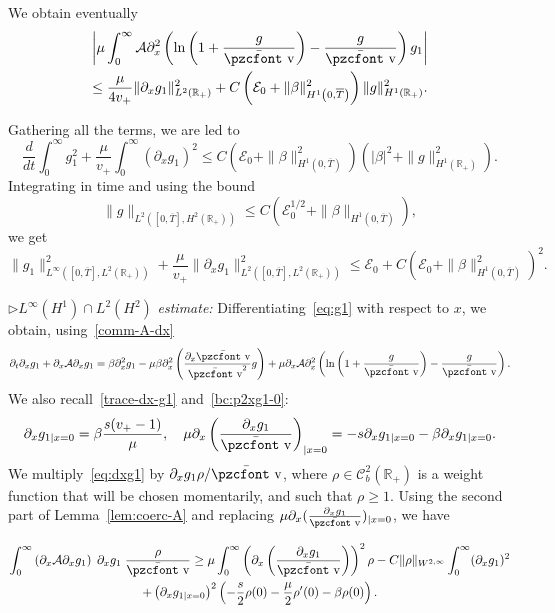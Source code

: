 \documentclass[10pt]{amsart}
\theoremstyle{definition}\newtheorem{defi}[theo]{Definition}\newtheorem{rema}[theo]{Remark}\newtheorem{exam}[theo]{Example}\newtheorem{exem}[theo]{Example}\newtheorem{nota}[theo]{Notation}
\newcommand{\mathpzc}[1]{\text{\pzcfont #1}}
\newcommand{\R}{\mathbb{R}}
\newcommand{\p}{\partial}
\newcommand{\bv}{\bar{\mathpzc{v}}}
\newcommand{\cA}{\mathcal A}
\newcommand{\cE}{\mathcal E}
\newcommand{\cC}{\mathcal C}
\begin{document}
\begin{itemize}
We obtain eventually
\begin{multline*}
\left| \mu \int_0^\infty\cA \p_x^2 \left(\ln\left(1+ \frac{g}{\bv}\right) - \frac{g}{\bv}\right) g_1\right|\\
\leq \frac{\mu}{4 v_+}\|\p_x g_1\|_{L^2(\R_+)}^2 + C \left(\cE_0 + \|\beta\|_{H^1\left(0, \overline{T}\right)}^2\right) \| g\|_{H^1(\R_+)}^2.
\end{multline*}
\end{itemize}
Gathering all the terms, we are led to
\[
\frac{d}{dt}\int_0^\infty g_1^2 + \frac{\mu}{v_+}\int_0^\infty (\p_x g_1)^2
\leq C\left(\cE_0 + \|\beta\|_{H^1\left(0, \overline{T}\right)}^2\right)\left(|\beta|^2 + \| g \|_{H^1(\R_+)}^2\right).
\]
Integrating in time and using the bound
\[
\|g\|_{L^2\left([0, \overline{T}], H^2(\R_+)\right)}\leq C\left(\cE_0^{1/2} + \|\beta\|_{H^1\left(0, \overline{T}\right)}\right),
\]
we get
\begin{equation}\label{borne-g1-L2H1}
\|g_1\|_{L^\infty\left([0,\overline{T}], L^2(\R_+)\right)}^2 + \frac{\mu}{v_+}\|\p_x g_1\|_{L^2\left([0,\overline{T}], L^2(\R_+)\right)}^2 \leq \cE_0 + C \left(\cE_0 + \|\beta\|_{H^1\left(0, \overline{T}\right)}^2\right)^2.
\end{equation}


$\rhd L^\infty(H^1)\cap L^2(H^2)$ \emph{estimate:} Differentiating~\eqref{eq:g1} with respect to $x$, we obtain, using~\eqref{comm-A-dx}
\begin{equation}\label{eq:dxg1}
\p_t \p_x g_1 + \p_x \cA \p_x g_1 = \beta \p_x^2 g_1 - \mu \beta \p_x^2\left(\frac{\p_x \bv}{\bv^2} g\right) + \mu \p_x \cA \p_x^2 \left(\ln\left(1+ \frac{g}{\bv}\right) - \frac{g}{\bv}\right).
\end{equation}
We also recall~\eqref{trace-dx-g1} and~\eqref{bc:p2xg1-0}:
\[
\p_x g_{1|x=0}= \beta \frac{s(v_+-1)}{\mu},\quad
\mu \p_x \left(\frac{\p_x g_1}{\bv}\right)_{|x=0} =- s \p_x g_{1|x=0} - \beta \p_x g_{1|x=0}.
\]
We multiply~\eqref{eq:dxg1} by $\p_x g_1 \rho/\bv $, where $\rho\in \cC^2_b(\R_+)$ is a weight function that will be chosen momentarily, and such that $\rho\geq 1$. Using the second part of Lemma~\ref{lem:coerc-A} and replacing $\mu \p_x (\frac{\p_x g_1}{\bv})_{|x=0}$, we have

\begin{multline*}
\int_0^\infty \left(\p_x \cA \p_x g_1\right) \;\p_x g_1 \; \frac{\rho}{\bv } \geq \mu \int_0^\infty \left(\p_x \left(\frac{\p_x g_1}{\bv}\right)\right)^2 \rho - C \|\rho\|_{W^{2,\infty}}\int_0^\infty (\p_x g_1)^2\\
+ \left(\p_x g_{1|x=0}\right)^2 \left(-\frac{s}{2} \rho(0)- \frac{\mu}{2}\rho'(0) - \beta \rho(0)\right).
\end{multline*}
\end{document}
